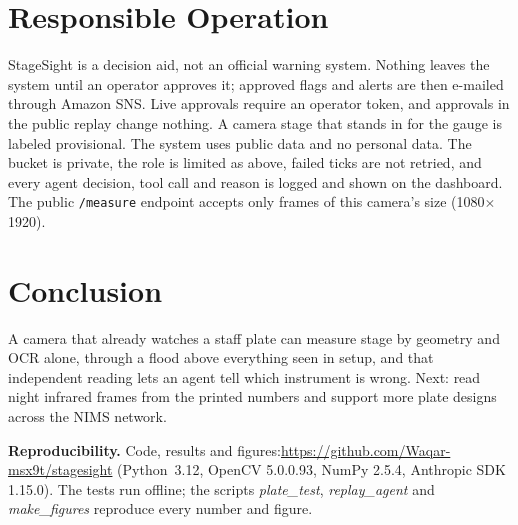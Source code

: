 \documentclass[conference,10pt,letterpaper]{IEEEtran}
\begin{document}
\section{Responsible Operation}
StageSight is a decision aid, not an official warning system. Nothing leaves the system until an
operator approves it; approved flags and alerts are then e-mailed through Amazon SNS. Live
approvals require an operator token, and approvals in the public
replay change nothing. A camera stage that stands in for the gauge is labeled provisional. The
system uses public data and no personal data. The bucket is private, the role is limited as
above, failed ticks are not retried, and every agent decision, tool call and reason is logged
and shown on the dashboard. The public \texttt{/measure} endpoint accepts only frames of this camera's size (1080$\times$1920).

\section{Conclusion}
A camera that already watches a staff plate can measure stage by geometry and OCR alone, through
a flood above everything seen in setup, and that independent reading lets an agent tell which
instrument is wrong. Next: read night infrared frames from the printed numbers and support more
plate designs across the NIMS network.

\textbf{Reproducibility.} Code, results and figures:\newline \url{https://github.com/Waqar-msx9t/stagesight}
(Python~3.12, OpenCV 5.0.0.93, NumPy 2.5.4, Anthropic SDK 1.15.0). The tests run offline; the
scripts \emph{plate\_test}, \emph{replay\_agent} and \emph{make\_figures} reproduce every number and
figure.
\end{document}
